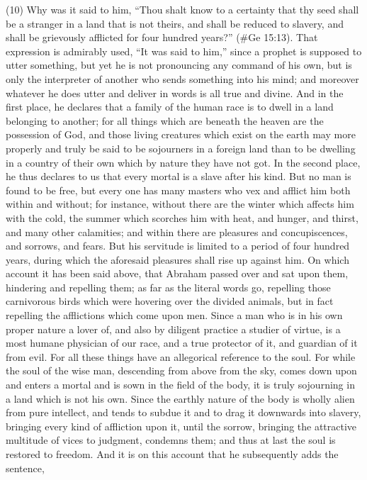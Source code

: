 (10) Why was it said to him, ``Thou shalt know to a certainty that thy seed shall be a stranger in a
land that is not theirs, and shall be reduced to slavery, and shall be grievously afflicted for four
hundred years?'' (\#Ge 15:13). That expression is admirably used, ``It was said to him,'' since a
prophet is supposed to utter something, but yet he is not pronouncing any command of his own, but
is only the interpreter of another who sends something into his mind; and moreover whatever he
does utter and deliver in words is all true and divine. And in the first place, he declares that a family
of the human race is to dwell in a land belonging to another; for all things which are beneath the
heaven are the possession of God, and those living creatures which exist on the earth may more
properly and truly be said to be sojourners in a foreign land than to be dwelling in a country of their
own which by nature they have not got. In the second place, he thus declares to us that every
mortal is a slave after his kind. But no man is found to be free, but every one has many masters
who vex and afflict him both within and without; for instance, without there are the winter which
affects him with the cold, the summer which scorches him with heat, and hunger, and thirst, and
many other calamities; and within there are pleasures and concupiscences, and sorrows, and
fears. But his servitude is limited to a period of four hundred years, during which the aforesaid
pleasures shall rise up against him. On which account it has been said above, that Abraham
passed over and sat upon them, hindering and repelling them; as far as the literal words go,
repelling those carnivorous birds which were hovering over the divided animals, but in fact repelling
the afflictions which come upon men. Since a man who is in his own proper nature a lover of, and
also by diligent practice a studier of virtue, is a most humane physician of our race, and a true
protector of it, and guardian of it from evil. For all these things have an allegorical reference to the
soul. For while the soul of the wise man, descending from above from the sky, comes down upon
and enters a mortal and is sown in the field of the body, it is truly sojourning in a land which is not
his own. Since the earthly nature of the body is wholly alien from pure intellect, and tends to subdue
it and to drag it downwards into slavery, bringing every kind of affliction upon it, until the sorrow,
bringing the attractive multitude of vices to judgment, condemns them; and thus at last the soul is
restored to freedom. And it is on this account that he subsequently adds the sentence,
